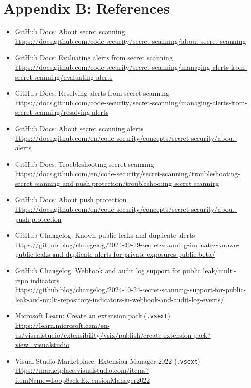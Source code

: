 \documentclass[11pt]{article}
\newcommand{\codeinline}[1]{\texttt{#1}}
\begin{document}
\section{Appendix B: References}
\begin{itemize}
\raggedright
  \item GitHub Docs: About secret scanning\\
    \url{https://docs.github.com/code-security/secret-scanning/about-secret-scanning}
  \item GitHub Docs: Evaluating alerts from secret scanning\\
    \url{https://docs.github.com/code-security/secret-scanning/managing-alerts-from-secret-scanning/evaluating-alerts}
  \item GitHub Docs: Resolving alerts from secret scanning\\
    \url{https://docs.github.com/code-security/secret-scanning/managing-alerts-from-secret-scanning/resolving-alerts}
  \item GitHub Docs: About secret scanning alerts\\
    \url{https://docs.github.com/en/code-security/concepts/secret-security/about-alerts}
  \item GitHub Docs: Troubleshooting secret scanning\\
    \url{https://docs.github.com/en/code-security/secret-scanning/troubleshooting-secret-scanning-and-push-protection/troubleshooting-secret-scanning}
  \item GitHub Docs: About push protection\\
    \url{https://docs.github.com/en/code-security/concepts/secret-security/about-push-protection}
  \item GitHub Changelog: Known public leaks and duplicate alerts\\
    \url{https://github.blog/changelog/2024-09-19-secret-scanning-indicates-known-public-leaks-and-duplicate-alerts-for-private-exposures-public-beta/}
  \item GitHub Changelog: Webhook and audit log support for public leak/multi-repo indicators\\
    \url{https://github.blog/changelog/2024-10-24-secret-scanning-support-for-public-leak-and-multi-repository-indicators-in-webhook-and-audit-log-events/}
  \item Microsoft Learn: Create an extension pack (\codeinline{.vsext})\\
    \url{https://learn.microsoft.com/en-us/visualstudio/extensibility/vsix/publish/create-extension-pack?view=visualstudio}
  \item Visual Studio Marketplace: Extension Manager 2022 (\codeinline{.vsext})\\
    \url{https://marketplace.visualstudio.com/items?itemName=Loop8ack.ExtensionManager2022}
\end{itemize}
\end{document}
